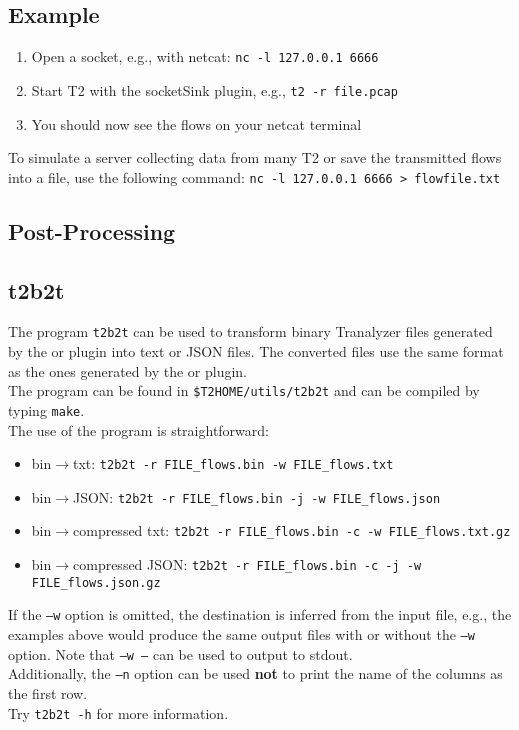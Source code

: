 \documentclass[documentation]{subfiles}
\begin{document}
\subsection{Example}

\begin{enumerate}
    \item Open a socket, e.g., with netcat: {\tt nc -l 127.0.0.1 6666}
    \item Start T2 with the socketSink plugin, e.g., {\tt t2 -r file.pcap}
    \item You should now see the flows on your netcat terminal
\end{enumerate}

To simulate a server collecting data from many T2 or save the transmitted flows into a file, use the following command:
{\tt nc -l 127.0.0.1 6666 > flowfile.txt}

\subsection{Post-Processing}

\subsection{t2b2t}
The program {\tt t2b2t} can be used to transform binary Tranalyzer files generated by the  or  plugin into text or JSON files.
The converted files use the same format as the ones generated by the  or  plugin.\\

The program can be found in {\tt\$T2HOME/utils/t2b2t} and can be compiled by typing {\tt make}.\\

The use of the program is straightforward:
\begin{itemize}
    \item bin$\rightarrow$txt: {\tt t2b2t -r FILE\_flows.bin -w FILE\_flows.txt}
    \item bin$\rightarrow$JSON: {\tt t2b2t -r FILE\_flows.bin -j -w FILE\_flows.json}
    \item bin$\rightarrow$compressed txt: {\tt t2b2t -r FILE\_flows.bin -c -w FILE\_flows.txt.gz}
    \item bin$\rightarrow$compressed JSON: {\tt t2b2t -r FILE\_flows.bin -c -j -w FILE\_flows.json.gz}
\end{itemize}

If the {\tt --w} option is omitted, the destination is inferred from the input file, e.g., the examples above would produce the same output files with or without the {\tt --w} option. Note that {\tt --w --} can be used to output to stdout.\\
Additionally, the {\tt --n} option can be used {\bf not} to print the name of the columns as the first row.\\
Try {\tt t2b2t -h} for more information.
\end{document}
